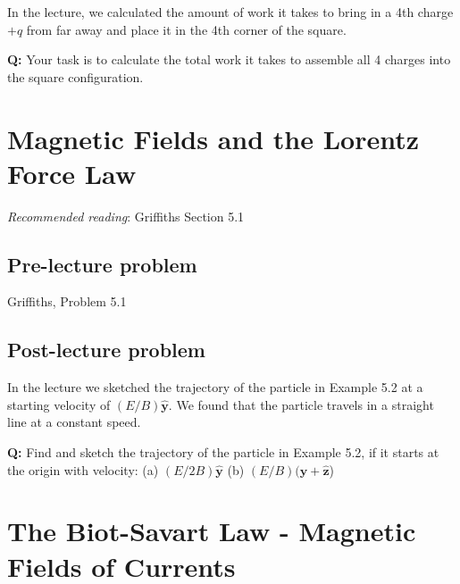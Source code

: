 \documentclass[
  letterpaper,
  DIV=11,
  numbers=noendperiod]{scrreprt}
\begin{document}
In the lecture, we calculated the amount of work it takes to bring in a
4th charge \(+q\) from far away and place it in the 4th corner of the
square.

\textbf{Q:} Your task is to calculate the total work it takes to
assemble all 4 charges into the square configuration.


\chapter{Magnetic Fields and the Lorentz Force
Law}\label{magnetic-fields-and-the-lorentz-force-law}

\newcommand{\l}{\mathrm{\mathbf{l}}}
\newcommand{\E}{\mathrm{\mathbf{E}}}
\newcommand{\F}{\mathrm{\mathbf{F}}}
\newcommand{\r}{\mathrm{\mathbf{r}}}

\newcommand{\x}{\mathrm{\mathbf{x}}}
\newcommand{\y}{\mathrm{\mathbf{y}}}
\newcommand{\z}{\mathrm{\mathbf{z}}}

\emph{Recommended reading}: Griffiths Section 5.1

\section{Pre-lecture problem}\label{pre-lecture-problem-2}

Griffiths, Problem 5.1

\section{Post-lecture problem}\label{post-lecture-problem-3}

In the lecture we sketched the trajectory of the particle in Example 5.2
at a starting velocity of \((E/B) \hat{\mathrm{\mathbf{y}}}\). We found
that the particle travels in a straight line at a constant speed.

\textbf{Q:} Find and sketch the trajectory of the particle in Example
5.2, if it starts at the origin with velocity: (a)
\((E/2B) \hat{\mathrm{\mathbf{y}}}\) (b)
\((E/B) (\hat{\mathrm{\mathbf{y}}} + \hat{\mathrm{\mathbf{z}}}\))


\chapter{The Biot-Savart Law - Magnetic Fields of
Currents}\label{the-biot-savart-law---magnetic-fields-of-currents}
\end{document}
